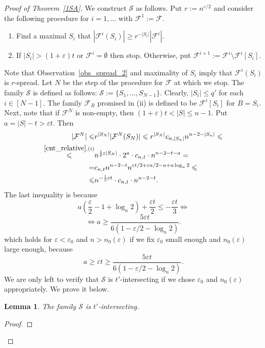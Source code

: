 \documentclass[11pt,letterpaper]{amsart}
\newcommand{\eps}{\varepsilon}
\renewcommand{\le}{\leqslant}
\renewcommand{\ge}{\geqslant}
\newcommand{\ff}{\mathcal{F}}
\newcommand{\s}{\mathcal{S}}
\newtheorem{lemma}[theorem]{Lemma}
\begin{document}
\begin{proof}[Proof of Theorem~\ref{1SA}] We construct $\mathcal S$ as follows. Put $r:=%
n^{\eps/2}$ and consider the following procedure for $i=1,\ldots $ with $\ff^1:=\ff$.
\begin{enumerate}
    \item Find a maximal $S_i$ that  $|\ff^i(S_i)|\ge  r^{-|S_i|}|\ff^i|$.
    \item If $|S_i|> (1+\eps)t$ or $\ff^i = \emptyset$ then stop. Otherwise, put $\ff^{i+1}:=\ff^i\setminus \ff^i[S_i]$.
\end{enumerate}
Note that Observation~\ref{obs_spread_2} and maximality of $S_i$ imply that $\ff^i(S_i)$ is $r$-spread.
Let $N$ be the step of the procedure for $\ff$ at which we stop. The family $\s$ is defined as follows: $\s:=\{S_1,\ldots, S_{N-1}\}$. Clearly, $|S_i|\le q'$ for each $i\in [N-1]$. The family $\ff_{B}$ promised in (ii) is defined to be $\ff^i[S_i]$ for $B=S_i$. Next, note that if $\ff^N$ is non-empty, then $(1+\eps)t < |S| \le n-1$. Put $a = |S| - t > \eps t$. Then
\begin{align*}
|\ff^N|\le&r^{|S_N|}  |\ff^{N}(S_N)|\le  r^{|S_N|}c_{n, |S_n|}n^{n-2-|S_n|} \le \\ 
\overset{\ref{cnt_relative}, (i)}{\le}&
n^{\frac 12\eps|S_N|}\cdot 2^a\cdot c_{n, t}\cdot n^{n - 2 - t - a} = \\
=& c_{n, t}n^{n-2-t}n^{\eps t/2 + \eps a/2 - a+a\log_n2} \le \\
\le& n^{-\frac13\eps t}\cdot c_{n, t} \cdot n^{n-2-t}. 
\end{align*}
The last inequality is because $$a\left(\frac \eps2 - 1 + \log_n2\right) + \frac{\eps t}2 \leqslant -\frac{\eps t}3 \Longleftrightarrow$$ $$\Longleftrightarrow a\ge \frac{5 \eps t}{6(1 - \eps/2 - \log_n2)}.$$ which holds for $\eps < \eps_0$ and $n > n_0(\eps)$ if we fix $\eps_0$ small enough and $n_0(\eps)$ large enough, because $$a \ge \eps t \ge  \frac{5 \eps t}{6(1 - \eps/2 - \log_n2)}.$$ We are only left to verify that $\s$ is $t'$-intersecting if we chose $\eps_0$ and $n_0(\eps)$ appropriately. We prove it below.

\begin{lemma}\label{lemtint_1SA} The family $\mathcal S$ is $t'$-intersecting. \end{lemma}
\begin{proof}


\end{proof}
\end{proof}
\end{document}

